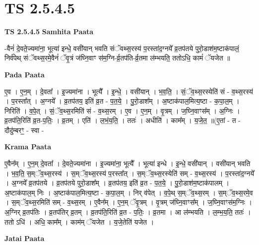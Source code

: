 \documentclass[17pt]{extarticle}
\begin{document}
\section*{ TS 2.5.4.5 }

\textbf{TS 2.5.4.5 } \newline
\textbf{Samhita Paata} \newline

-वैनं॑ दे॒वते॒ज्यमा॑ना॒ भूत्या॑ इन्धे॒ वसी॑यान् भवति संॅवथ्स॒रस्य॑ प॒रस्ता॑द॒ग्नये᳚ व्र॒तप॑तये पुरो॒डाश॑म॒ष्टाक॑पालं॒ निर्व॑पेथ् संॅवथ्स॒रमे॒वैनं॑ ॅवृ॒त्रं ज॑घ्नि॒वाꣳ स॑म॒ग्नि-र्व्र॒तप॑ति-र्व्र॒तमा ल॑म्भयति॒ ततोऽधि॒ कामं॑ ॅयजेत ॥ \newline

\textbf{Pada Paata} \newline

ए॒व । ए॒न॒म् । दे॒वता᳚ । इ॒ज्यमा॑ना । भूत्यै᳚ । इ॒न्धे॒ । वसी॑यान् । भ॒व॒ति॒ । सं॒ॅव॒थ्स॒रस्येति॑ सं - व॒थ्स॒रस्य॑ । प॒रस्ता᳚त् । अ॒ग्नये᳚ । व्र॒तप॑तय॒ इति॑ व्र॒त - प॒त॒ये॒ । पु॒रो॒डाश᳚म् । अ॒ष्टाक॑पाल॒मित्य॒ष्टा - क॒पा॒ल॒म् । निरिति॑ । व॒पे॒त् । सं॒ॅव॒थ्स॒रमिति॑ सं - व॒थ्स॒रम् । ए॒व । ए॒न॒म् । वृ॒त्रम् । ज॒घ्नि॒वाꣳस᳚म् । अ॒ग्निः । व्र॒तप॑ति॒रिति॑ व्र॒त-प॒तिः॒ । व्र॒तम् । एति॑ । ल॒भं॒य॒ति॒ । ततः॑ । अधीति॑ । काम᳚म् । य॒जे॒त॒ ॥(ए॒तां - त - दौदु॑म्बरꣳ॒॒ - स्वा -  \newline


\textbf{Krama Paata} \newline

ए॒वैन᳚म् । ए॒न॒म् दे॒वता᳚ । दे॒वते॒ज्यमा॑ना । इ॒ज्यमा॑ना॒ भूत्यै᳚ । भूत्या॑ इन्धे । इ॒न्धे॒ वसी॑यान् । वसी॑यान् भवति । भ॒व॒ति॒ स॒म्ॅव॒थ्स॒रस्य॑ । स॒म्ॅव॒थ्स॒रस्य॑ प॒रस्ता᳚त् । स॒म्ॅव॒थ्स॒रस्येति॑ सम् - व॒थ्स॒रस्य॑ । प॒रस्ता॑द॒ग्नये᳚ । अ॒ग्नये᳚ व्र॒तप॑तये । व्र॒तप॑तये पुरो॒डाश᳚म् । व्र॒तप॑तय॒ इति॑ व्र॒त - प॒त॒ये॒ । पु॒रो॒डाश॑म॒ष्टाक॑पालम् । अ॒ष्टाक॑पाल॒म् निः । अ॒ष्टाक॑पाल॒मित्य॒ष्टा - क॒पा॒ल॒म् । निर् व॑पेत् । व॒पे॒थ् स॒म्ॅव॒थ्स॒रम् । स॒म्ॅव॒थ्स॒रमे॒व । स॒म्ॅव॒थ्स॒रमिति॑ सम् - व॒थ्स॒रम् । ए॒वैन᳚म् । ए॒न॒म् ॅवृ॒त्रम् । वृ॒त्रम् ज॑घ्नि॒वाꣳस᳚म् । ज॒घ्नि॒वाꣳस॑म॒ग्निः । अ॒ग्निर् व्र॒तप॑तिः । व्र॒तप॑तिर् व्र॒तम् । व्र॒तप॑ति॒रिति॑ व्र॒त - प॒तिः॒ । व्र॒तमा । आ ल॑म्भयति । ल॒म्भ॒य॒ति॒ ततः॑ । ततो ऽधि॑ । अधि॒ काम᳚म् । काम॑म् ॅयजेत । य॒जे॒तेति॑ यजेत । \newline

\textbf{Jatai Paata} \newline
\end{document}
